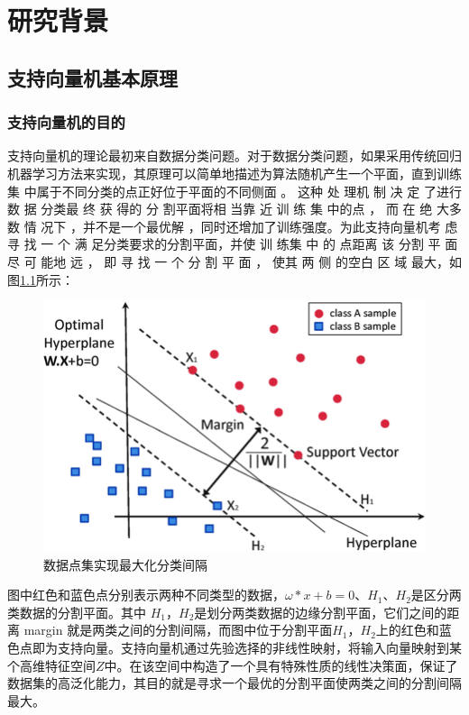 
\chapter{\hei \textbf{研究背景}}

\section{\hei 支持向量机基本原理}
\subsection{支持向量机的目的}
支持向量机的理论最初来自数据分类问题。对于数据分类问题，如果采用传统回归机器学习方法来实现，其原理可以简单地描述为算法随机产生一个平面，直到训练集 中属于不同分类的点正好位于平面的不同侧面 。 这种 处 理机 制 决 定 了进行 数 据 分类最 终 获 得的 分 割平面将相 当靠 近 训 练 集 中的点 ， 而 在 绝 大多数 情 况下 ，并不是一个最优解 ，同时还增加了训练强度\cite{张松兰2016支持向量机的算法及应用综述}。为此支持向量机考 虑寻 找 一 个 满 足分类要求的分割平面，并使 训 练集 中 的 点距离 该 分割 平 面 尽 可 能地 远 ， 即 寻 找 一 个 分 割 平 面 ， 使其 两 侧 的空白 区 域 最大，如图\ref{fig:2.1}所示：

\begin{figure}[!h]
	\centering
	\includegraphics[scale=0.4]{figures/SVM1.png}
	\caption{数据点集实现最大化分类间隔}
	\label{fig:2.1}
\end{figure}
图中红色和蓝色点分别表示两种不同类型的数据，$\omega*x+b=0$、$H_1$、$H_2$是区分两类数据的分割平面。其中 $H_1$，$H_2$是划分两类数据的边缘分割平面，它们之间的距离 margin 就是两类之间的分割间隔，而图中位于分割平面$H_1$，$H_2$上的红色和蓝色点即为支持向量\cite{张松兰2016支持向量机的算法及应用综述}。支持向量机通过先验选择的非线性映射，将输入向量映射到某个高维特征空间$Z$中。在该空间中构造了一个具有特殊性质的线性决策面，保证了数据集的高泛化能力\cite{cortes1995support}，其目的就是寻求一个最优的分割平面使两类之间的分割间隔最大。

